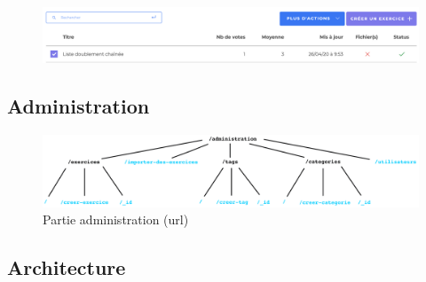 \begin{figure}[H]
    \includegraphics[width=\textwidth,height=\textheight,keepaspectratio]{images/client/gestion-options.png}
    \centering
\end{figure}




\subsection{Administration}

\begin{figure}[H]
    \includegraphics[width=\textwidth,height=\textheight,keepaspectratio]{images/client/administration.jpeg}
    \centering
    \caption[SourceCode : partie administration (url)]{Partie administration (url)}
\end{figure}


\subsection{Architecture}
